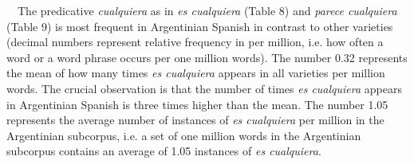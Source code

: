 \begin{styleStandard}
\ \ The predicative \textit{cualquiera} as in \textit{es cualquiera }(Table 8) and\textit{ parece cualquiera} (Table 9) is most frequent in Argentinian Spanish in contrast to other varieties (decimal numbers represent relative frequency in per million, i.e. how often a word or a word phrase occurs per one million words). The number 0.32 represents the mean of how many times \textit{es cualquiera} appears in all varieties per million words. The crucial observation is that the number of times \textit{es cualquiera} appears in Argentinian Spanish is three times higher than the mean. The number 1.05 represents the average number of instances of \textit{es cualquiera} per million in the Argentinian subcorpus, i.e. a set of one million words in the Argentinian subcorpus contains an average of 1.05 instances of \textit{es cualquiera}. 
\end{styleStandard}

